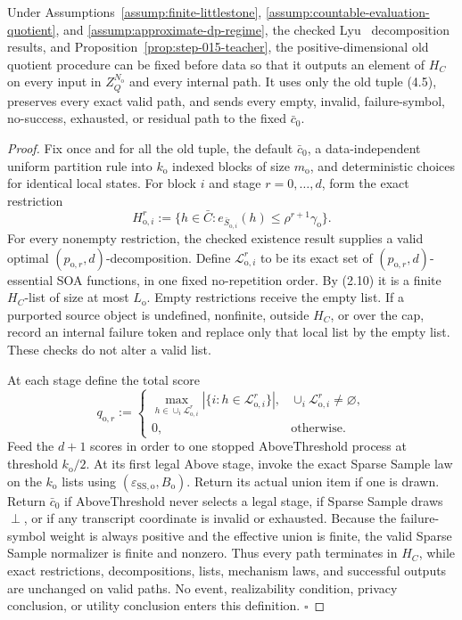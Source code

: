 \begin{proposition}\label{prop:step-015-total}
Under Assumptions~\ref{assump:finite-littlestone},
\ref{assump:countable-evaluation-quotient}, and
\ref{assump:approximate-dp-regime}, the checked Lyu~\citep{lyu2025} decomposition results,
and Proposition~\ref{prop:step-015-teacher}, the positive-dimensional old
quotient procedure can be fixed before data so that it outputs an element
of \(H_C\) on every input in \(Z_Q^{N_{\mathrm o}}\) and every internal
path. It uses only the old tuple (4.5), preserves every exact valid
path, and sends every empty, invalid, failure-symbol, no-success, exhausted,
or residual path to the fixed \(\bar c_0\).


\end{proposition}

\begin{proof}
Fix once and for all the old tuple, the default \(\bar c_0\), a
data-independent uniform partition rule into \(k_{\mathrm o}\) indexed
blocks of size \(m_{\mathrm o}\), and deterministic choices for identical
local states. For block \(i\) and stage \(r=0,\ldots,d\), form the exact
restriction
\[
H_{\mathrm o,i}^r
:=\{h\in\bar C:
e_{\bar S_{\mathrm o,i}}(h)
\le\rho^{r+1}\gamma_{\mathrm o}\}.
\tag{5.1}
\]
For every nonempty restriction, the checked existence result supplies a
valid optimal \((p_{\mathrm o,r},d)\)-decomposition. Define
\(\mathcal L_{\mathrm o,i}^r\) to be its exact set of
\((p_{\mathrm o,r},d)\)-essential SOA functions, in one fixed
no-repetition order. By (2.10) it is a finite \(H_C\)-list of size at most
\(L_{\mathrm o}\). Empty restrictions receive the empty list. If a
purported source object is undefined, nonfinite, outside \(H_C\), or over
the cap, record an internal failure token and replace only that local list
by the empty list. These checks do not alter a valid list.

At each stage define the total score
\[
q_{\mathrm o,r}:=
\begin{cases}
\displaystyle\max_{h\in\cup_i\mathcal L_{\mathrm o,i}^r}
|\{i:h\in\mathcal L_{\mathrm o,i}^r\}|,&
\cup_i\mathcal L_{\mathrm o,i}^r\ne\varnothing,\\
0,&\text{otherwise}.
\end{cases}
\tag{5.2}
\]
Feed the \(d+1\) scores in order to one stopped AboveThreshold process at
threshold \(k_{\mathrm o}/2\). At its first legal Above stage, invoke the
exact Sparse Sample law on the \(k_{\mathrm o}\) lists using
\((\varepsilon_{\mathrm{SS,o}},B_{\mathrm o})\). Return its actual union
item if one is drawn. Return \(\bar c_0\) if AboveThreshold never selects a
legal stage, if Sparse Sample draws \(\perp\), or if any transcript
coordinate is invalid or exhausted. Because the failure-symbol weight is
always positive and the effective union is finite, the valid Sparse
Sample normalizer is finite and nonzero. Thus every path terminates in
\(H_C\), while exact restrictions, decompositions, lists, mechanism laws,
and successful outputs are unchanged on valid paths. No event,
realizability condition, privacy conclusion, or utility conclusion enters
this definition. \(\square\)


\end{proof}

